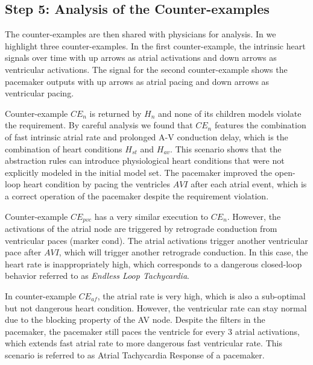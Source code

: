 	\vspace{-10pt}
\subsection*{Step 5: Analysis of the Counter-examples}
The counter-examples are then shared with physicians for analysis. In  we highlight three counter-examples. In the first counter-example, the intrinsic heart signals over time with up arrows as atrial activations and down arrows as ventricular activations. The signal for the second counter-example shows the pacemaker outputs with up arrows as atrial pacing and down arrows as ventricular pacing.%

Counter-example $CE_{n}$ is returned by $H_n$ and none of its children models violate the requirement. By careful analysis we found that $CE_{n}$ features the combination of fast intrinsic atrial rate and prolonged A-V conduction delay, which is the combination of heart conditions $H_{st}$ and $H_{av}$. This scenario shows that the abstraction rules can introduce physiological heart conditions that were not explicitly modeled in the initial model set. The pacemaker improved the open-loop heart condition by pacing the ventricles $AVI$ after each atrial event, which is a correct operation of the pacemaker despite the requirement violation. 

Counter-example $CE_{pvc}$ has a very similar execution to $CE_{n}$. However, the activations of the atrial node are triggered by retrograde conduction from ventricular paces (marker \textsf{cond}). The atrial activations trigger another ventricular pace after $AVI$, which will trigger another retrograde conduction. In this case, the heart rate is inappropriately high, which corresponds to a dangerous closed-loop behavior referred to as \emph{Endless Loop Tachycardia}.

In counter-example $CE_{af}$, the atrial rate is very high, which is also a sub-optimal but not dangerous heart condition. 
However, the ventricular rate can stay normal due to the blocking property of the AV node. 
Despite the filters in the pacemaker, the pacemaker still paces the ventricle for every 3 atrial activations, which extends fast atrial rate to more dangerous fast ventricular rate. 
This scenario is referred to as Atrial Tachycardia Response of a pacemaker. 

